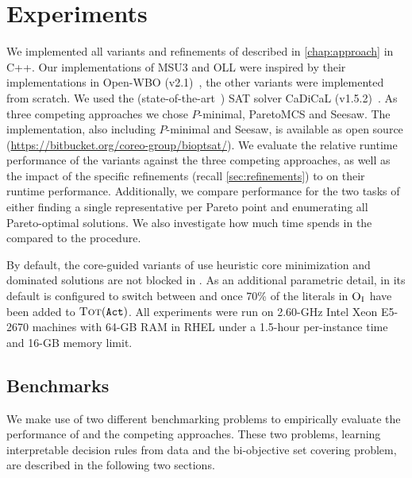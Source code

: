 \chapter{Experiments\label{chap:experiments}}

We implemented  all variants and refinements of \algname{} described in \cref{chap:approach} in C++.
Our implementations of MSU3 and OLL were inspired by their implementations in Open-WBO (v2.1)~\autocite{DBLP:conf/sat/MartinsML14}, the other variants were implemented from scratch.
We used the (state-of-the-art~\autocite{DBLP:journals/ai/FroleyksHIJS21}) SAT solver CaDiCaL (v1.5.2)~\autocite{BiereFazekasFleuryHeisinger-SAT-Competition-2020-solvers}.
As three competing approaches we chose $P$-minimal, ParetoMCS and Seesaw.
The implementation, also including $P$-minimal and Seesaw, is available as open source ({\small\url{https://bitbucket.org/coreo-group/bioptsat/}}).
We evaluate the relative runtime performance of the \algname{} variants against the three competing approaches, as well as the impact of the specific refinements (recall \cref{sec:refinements}) to \algname{} on their runtime performance.
Additionally, we compare performance for the two tasks of either finding a single representative per Pareto point and enumerating all Pareto-optimal solutions.
We also investigate how much time \algname{} spends in the \Min{} compared to the \Simpr{} procedure.

By default, the core-guided variants of \algname{} use heuristic core minimization and dominated solutions are not blocked in \satunsat{}.
As an additional parametric detail, in its default \msh{} is configured to switch between \msu{} and \satunsat{} once 70\% of the literals in $\textsc{O}_{\text{I}}$ have been added to $\textsc{Tot}(\texttt{Act})$.
All experiments were run on 2.60-GHz Intel Xeon E5-2670 machines with 64-GB RAM in RHEL under a 1.5-hour per-instance time and 16-GB memory limit.

\section{Benchmarks\label{sec:benchmarks}}

We make use of two different benchmarking problems to empirically evaluate the performance of \algname{} and the competing approaches.
These two problems, learning interpretable decision rules from data and the bi-objective set covering problem, are described in the following two sections.

